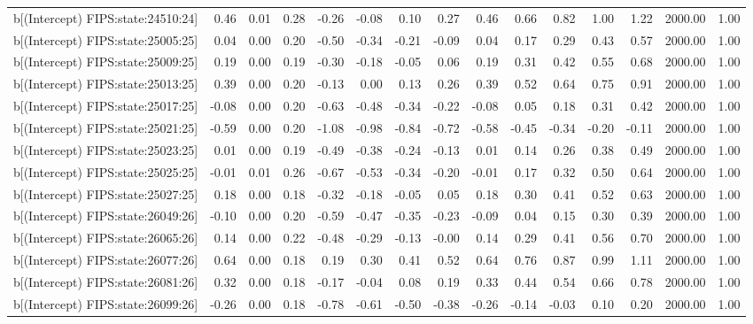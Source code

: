 \begin{table}[ht]
\begin{tabular}{rrrrrrrrrrrrrrr}
  b[(Intercept) FIPS:state:24510:24] & 0.46 & 0.01 & 0.28 & -0.26 & -0.08 & 0.10 & 0.27 & 0.46 & 0.66 & 0.82 & 1.00 & 1.22 & 2000.00 & 1.00 \\ 
  b[(Intercept) FIPS:state:25005:25] & 0.04 & 0.00 & 0.20 & -0.50 & -0.34 & -0.21 & -0.09 & 0.04 & 0.17 & 0.29 & 0.43 & 0.57 & 2000.00 & 1.00 \\ 
  b[(Intercept) FIPS:state:25009:25] & 0.19 & 0.00 & 0.19 & -0.30 & -0.18 & -0.05 & 0.06 & 0.19 & 0.31 & 0.42 & 0.55 & 0.68 & 2000.00 & 1.00 \\ 
  b[(Intercept) FIPS:state:25013:25] & 0.39 & 0.00 & 0.20 & -0.13 & 0.00 & 0.13 & 0.26 & 0.39 & 0.52 & 0.64 & 0.75 & 0.91 & 2000.00 & 1.00 \\ 
  b[(Intercept) FIPS:state:25017:25] & -0.08 & 0.00 & 0.20 & -0.63 & -0.48 & -0.34 & -0.22 & -0.08 & 0.05 & 0.18 & 0.31 & 0.42 & 2000.00 & 1.00 \\ 
  b[(Intercept) FIPS:state:25021:25] & -0.59 & 0.00 & 0.20 & -1.08 & -0.98 & -0.84 & -0.72 & -0.58 & -0.45 & -0.34 & -0.20 & -0.11 & 2000.00 & 1.00 \\ 
  b[(Intercept) FIPS:state:25023:25] & 0.01 & 0.00 & 0.19 & -0.49 & -0.38 & -0.24 & -0.13 & 0.01 & 0.14 & 0.26 & 0.38 & 0.49 & 2000.00 & 1.00 \\ 
  b[(Intercept) FIPS:state:25025:25] & -0.01 & 0.01 & 0.26 & -0.67 & -0.53 & -0.34 & -0.20 & -0.01 & 0.17 & 0.32 & 0.50 & 0.64 & 2000.00 & 1.00 \\ 
  b[(Intercept) FIPS:state:25027:25] & 0.18 & 0.00 & 0.18 & -0.32 & -0.18 & -0.05 & 0.05 & 0.18 & 0.30 & 0.41 & 0.52 & 0.63 & 2000.00 & 1.00 \\ 
  b[(Intercept) FIPS:state:26049:26] & -0.10 & 0.00 & 0.20 & -0.59 & -0.47 & -0.35 & -0.23 & -0.09 & 0.04 & 0.15 & 0.30 & 0.39 & 2000.00 & 1.00 \\ 
  b[(Intercept) FIPS:state:26065:26] & 0.14 & 0.00 & 0.22 & -0.48 & -0.29 & -0.13 & -0.00 & 0.14 & 0.29 & 0.41 & 0.56 & 0.70 & 2000.00 & 1.00 \\ 
  b[(Intercept) FIPS:state:26077:26] & 0.64 & 0.00 & 0.18 & 0.19 & 0.30 & 0.41 & 0.52 & 0.64 & 0.76 & 0.87 & 0.99 & 1.11 & 2000.00 & 1.00 \\ 
  b[(Intercept) FIPS:state:26081:26] & 0.32 & 0.00 & 0.18 & -0.17 & -0.04 & 0.08 & 0.19 & 0.33 & 0.44 & 0.54 & 0.66 & 0.78 & 2000.00 & 1.00 \\ 
  b[(Intercept) FIPS:state:26099:26] & -0.26 & 0.00 & 0.18 & -0.78 & -0.61 & -0.50 & -0.38 & -0.26 & -0.14 & -0.03 & 0.10 & 0.20 & 2000.00 & 1.00 \\ 

\end{tabular}
\end{table}
